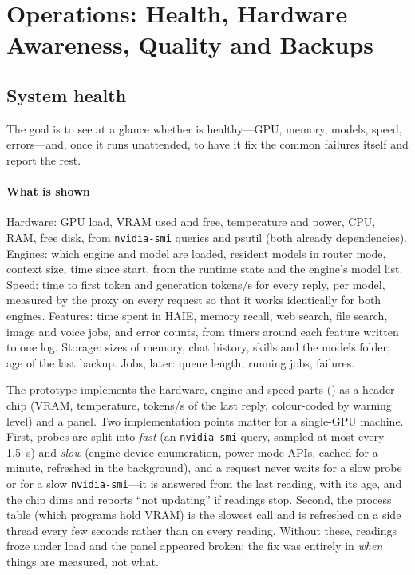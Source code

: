 \section{Operations: Health, Hardware Awareness, Quality and Backups}
\label{sec:operations}

\subsection{System health}

The goal is to see at a glance whether \hivi{} is healthy---GPU, memory, models, speed, errors---and, once it runs unattended, to have it fix the common failures itself and report the rest.

\paragraph{What is shown} Hardware: GPU load, VRAM used and free, temperature and power, CPU, RAM, free disk, from \texttt{nvidia-smi} queries and psutil (both already dependencies). Engines: which engine and model are loaded, resident models in router mode, context size, time since start, from the runtime state and the engine's model list. Speed: time to first token and generation tokens/s for every reply, per model, measured by the proxy on every request so that it works identically for both engines. Features: time spent in HAIE, memory recall, web search, file search, image and voice jobs, and error counts, from timers around each feature written to one log. Storage: sizes of memory, chat history, skills and the models folder; age of the last backup. Jobs, later: queue length, running jobs, failures.

The prototype implements the hardware, engine and speed parts () as a header chip (VRAM, temperature, tokens/s of the last reply, colour-coded by warning level) and a panel. Two implementation points matter for a single-GPU machine. First, probes are split into \emph{fast} (an \texttt{nvidia-smi} query, sampled at most every 1.5~s) and \emph{slow} (engine device enumeration, power-mode APIs, cached for a minute, refreshed in the background), and a request never waits for a slow probe or for a slow \texttt{nvidia-smi}---it is answered from the last reading, with its age, and the chip dims and reports ``not updating'' if readings stop. Second, the process table (which programs hold VRAM) is the slowest call and is refreshed on a side thread every few seconds rather than on every reading. Without these, readings froze under load and the panel appeared broken; the fix was entirely in \emph{when} things are measured, not what.

